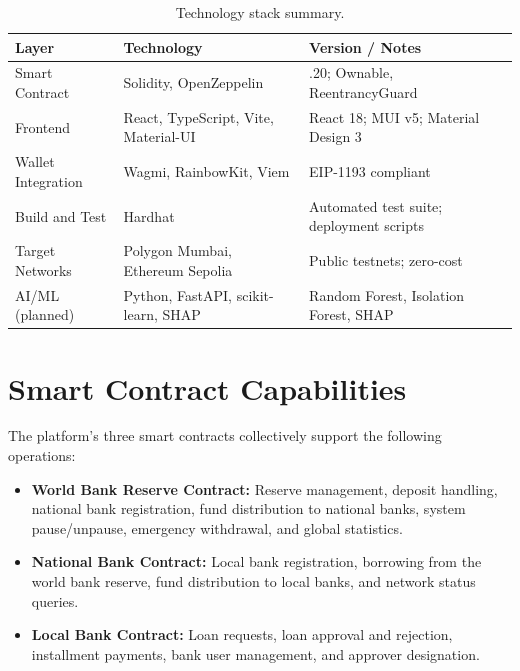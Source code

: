 \documentclass[12pt,a4paper]{report}
\newcommand{\tableheadfont}{\bfseries\small\color{PrimaryBlue}}
\newenvironment{moderntable}[1][H]{%
    \begin{table}[#1]\centering\small%
    \renewcommand{\arraystretch}{1.35}%
}{%
    \end{table}%
}
\begin{document}
\begin{moderntable}
\caption{Technology stack summary.}
\begin{tabular}{@{} >{\raggedright}p{3cm} >{\raggedright}p{4.5cm} >{\raggedright\arraybackslash}p{4.5cm} @{}}
\toprule
\tableheadfont Layer & \tableheadfont Technology & \tableheadfont Version / Notes \\
\midrule
\rowcolor{RowShade}
Smart Contract & Solidity, OpenZeppelin & 0.8.20; Ownable, ReentrancyGuard \\
Frontend & React, TypeScript, Vite, Material-UI & React 18; MUI v5; Material Design 3 \\
\rowcolor{RowShade}
Wallet Integration & Wagmi, RainbowKit, Viem & EIP-1193 compliant \\
Build and Test & Hardhat & Automated test suite; deployment scripts \\
\rowcolor{RowShade}
Target Networks & Polygon Mumbai, Ethereum Sepolia & Public testnets; zero-cost \\
AI/ML (planned) & Python, FastAPI, scikit-learn, SHAP & Random Forest, Isolation Forest, SHAP \\
\bottomrule
\end{tabular}
\end{moderntable}

\chapter{Smart Contract Capabilities}

The platform's three smart contracts collectively support the following operations:

\begin{itemize}[noitemsep]
\item \textbf{World Bank Reserve Contract:} Reserve management, deposit handling, national bank registration, fund distribution to national banks, system pause/unpause, emergency withdrawal, and global statistics.
\item \textbf{National Bank Contract:} Local bank registration, borrowing from the world bank reserve, fund distribution to local banks, and network status queries.
\item \textbf{Local Bank Contract:} Loan requests, loan approval and rejection, installment payments, bank user management, and approver designation.
\end{itemize}


\end{document}
